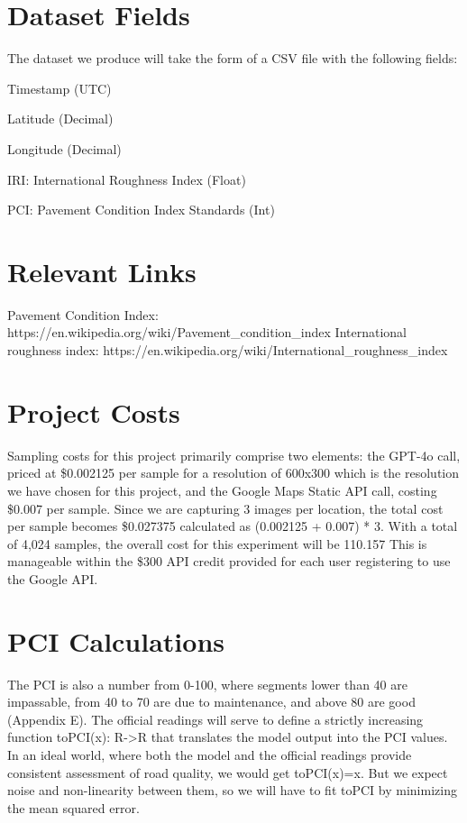 \documentclass{article}
\begin{document}
\begin{appendices}
\section{Dataset Fields}

The dataset we produce will take the form of a CSV file with the following fields:

\begin{description}[font=$\bullet$~\normalfont]
\item Timestamp (UTC)
\item Latitude (Decimal)
\item Longitude (Decimal)
\item IRI: International Roughness Index (Float)
\item PCI: Pavement Condition Index Standards (Int)
\end{description}


\section{Relevant Links}
Pavement Condition Index: https://en.wikipedia.org/wiki/Pavement\_condition\_index
International roughness index: https://en.wikipedia.org/wiki/International\_roughness\_index


\section{Project Costs}
Sampling costs for this project primarily comprise two elements: the GPT-4o call, priced at \$0.002125 per sample for a resolution of 600x300 which is the resolution we have chosen for this project, and the Google Maps Static API call, costing \$0.007 per sample. Since we are capturing 3 images per location, the total cost per sample becomes \$0.027375 calculated as (0.002125 + 0.007) * 3. With a total of 4,024 samples, the overall cost for this experiment will be 110.157 This is manageable within the \$300 API credit provided for each user registering to use the Google API.

\section{ PCI Calculations}
The PCI is also a number from 0-100, where segments lower than 40 are impassable, from 40 to 70 are due to maintenance, and above 80 are good (Appendix E). The official readings will serve to define a strictly increasing function toPCI(x): R->R that translates the model output into the PCI values. In an ideal world, where both the model and the official readings provide consistent assessment of road quality, we would get toPCI(x)=x. But we expect noise and non-linearity between them, so we will have to fit toPCI by minimizing the mean squared error.


\end{appendices}
\end{document}
